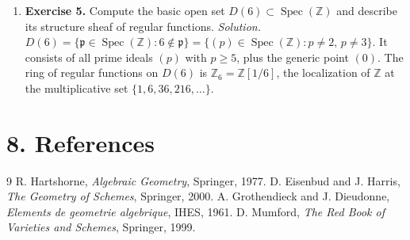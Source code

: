 \begin{enumerate}[leftmargin=*,itemsep=0.9em]
\item \textbf{Exercise 5.} Compute the basic open set $D(6)\subset\operatorname{Spec}(\mathbb{Z})$ and describe its structure sheaf of regular functions. \emph{Solution.} $D(6)=\{\mathfrak{p}\in\operatorname{Spec}(\mathbb{Z}):6\notin\mathfrak{p}\}=\{(p)\in\operatorname{Spec}(\mathbb{Z}):p\ne 2,\,p\ne 3\}$. It consists of all prime ideals $(p)$ with $p\geq 5$, plus the generic point $(0)$. The ring of regular functions on $D(6)$ is $\mathbb{Z}_6=\mathbb{Z}[1/6]$, the localization of $\mathbb{Z}$ at the multiplicative set $\{1,6,36,216,\ldots\}$.

\end{enumerate}
\section*{8. References}
\begin{thebibliography}{9}
 R. Hartshorne, \emph{Algebraic Geometry}, Springer, 1977.
 D. Eisenbud and J. Harris, \emph{The Geometry of Schemes}, Springer, 2000.
 A. Grothendieck and J. Dieudonne, \emph{Elements de geometrie algebrique}, IHES, 1961.
 D. Mumford, \emph{The Red Book of Varieties and Schemes}, Springer, 1999.
\end{thebibliography}
